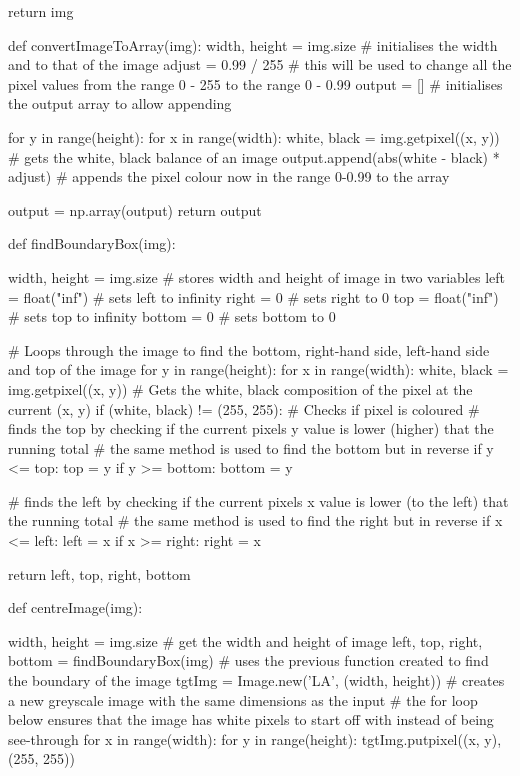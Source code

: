 \documentclass{report}
\begin{document}
\begin{python}
    return img


def convertImageToArray(img):
    width, height = img.size  # initialises the width and to that of the image
    adjust = 0.99 / 255  # this will be used to change all the pixel values from the range 0 - 255 to the range 0 - 0.99
    output = []  # initialises the output array to allow appending

    for y in range(height):
        for x in range(width):
            white, black = img.getpixel((x, y))  # gets the white, black balance of an image
            output.append(abs(white - black) * adjust)  # appends the pixel colour now in the range 0-0.99 to the array

    output = np.array(output)
    return output


def findBoundaryBox(img):

    width, height = img.size  # stores width and height of image in two variables
    left = float("inf")  # sets left to infinity
    right = 0  # sets right to 0
    top = float("inf")  # sets top to infinity
    bottom = 0  # sets bottom to 0

    # Loops through the image to find the bottom, right-hand side, left-hand side and top of the image
    for y in range(height):
        for x in range(width):
            white, black = img.getpixel((x, y))  # Gets the white, black composition of the pixel at the current (x, y)
            if (white, black) != (255, 255):  # Checks if pixel is coloured
                # finds the top by checking if the current pixels y value is lower (higher) that the running total
                # the same method is used to find the bottom but in reverse
                if y <= top:
                    top = y
                if y >= bottom:
                    bottom = y

                # finds the left by checking if the current pixels x value is lower (to the left) that the running total
                # the same method is used to find the right but in reverse
                if x <= left:
                    left = x
                if x >= right:
                    right = x

    return left, top, right, bottom


def centreImage(img):

    width, height = img.size  # get the width and height of image
    left, top, right, bottom = findBoundaryBox(img)  # uses the previous function created to find the boundary of the image
    tgtImg = Image.new('LA', (width, height))  # creates a new greyscale image with the same dimensions as the input
    # the for loop below ensures that the image has white pixels to start off with instead of being see-through
    for x in range(width):
        for y in range(height):
            tgtImg.putpixel((x, y), (255, 255))


\end{python}
\end{document}
